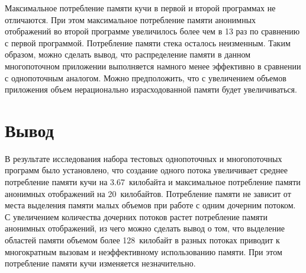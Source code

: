 Максимальное потребление памяти кучи в первой и второй программах не отличаются. При этом максимальное потребление памяти анонимных отображений во второй программе увеличилось более чем в 13 раз по сравнению с первой программой. Потребление памяти стека осталось неизменным. Таким образом, можно сделать вывод, что распределение памяти в данном многопоточном приложении выполняется намного менее эффективно в сравнении с однопоточным аналогом. Можно предположить, что с увеличением объемов приложения объем нерационально израсходованной памяти будет увеличиваться.


\section{Вывод}

В результате исследования набора тестовых однопоточных и многопоточных программ было установлено, что создание одного потока увеличивает среднее потребление памяти кучи на 3.67~килобайта и максимальное потребление памяти анонимных отображений на 20~килобайтов. Потребление памяти не зависит от места выделения памяти малых объемов при работе с одним дочерним потоком. С увеличением количества дочерних потоков растет потребление памяти анонимных отображений, из чего можно сделать вывод о том, что выделение областей памяти объемом более 128~килобайт в разных потоках приводит к многократным вызовам  и неэффективному использованию памяти. При этом потребление памяти кучи изменяется незначительно.